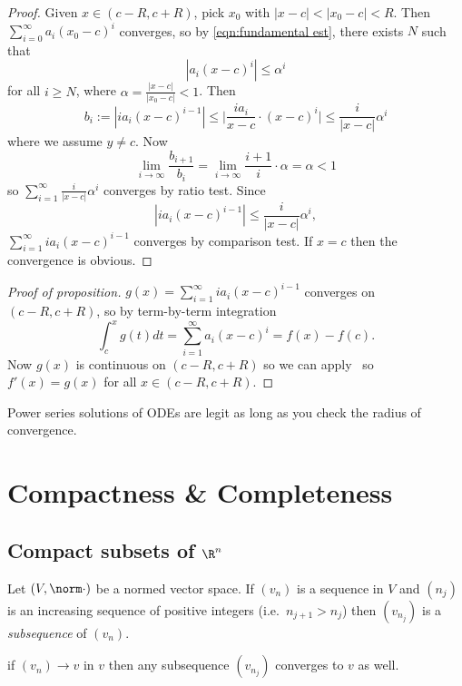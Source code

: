 \documentclass[a4paper]{article}
\theoremstyle{definition}
\begin{document}
\begin{proof}
  Given \(x\in(c-R,c+R)\), pick \(x_0\) with \(|x-c| < |x_0-c| < R\). Then \(\sum_{i=0}^{\infty}a_i(x_0-c)^i \) converges, so by \ref{eqn:fundamental est}, there exists \(N\) such that
  \[
    |a_i(x-c)^i| \leq \alpha^i
  \]
  for all \(i\geq N\), where \(\alpha = \frac{|x-c|}{|x_0-c|}<1\). Then
  \[
    b_i:= |i a_i (x-c)^{i-1}| \leq \Big| \frac{i a_i}{x-c}\cdot(x-c)^i \Big| \leq \frac{i}{|x-c|}\alpha^i
  \]
  where we assume \(y\neq c\). Now
  \[
    \lim_{i\to\infty} \frac{b_{i+1}}{b_i} = \lim_{i\to\infty} \frac{i+1}{i}\cdot\alpha = \alpha<1
  \]
  so \(\sum_{i=1}^{\infty}\frac{i}{|x-c|}\alpha^i \) converges by ratio test. Since
  \[
    |i a_i(x-c)^{i-1}| \leq \frac{i}{|x-c|}\alpha^i,
  \]
  \(\sum_{i=1}^{\infty}i a_i(x-c)^{i-1} \) converges by comparison test. If \(x=c\) then the convergence is obvious.
\end{proof}

\begin{proof}[Proof of proposition]
  \(g(x) = \sum_{i=1}^{\infty}i a_i (x-c)^{i-1} \) converges on \((c-R,c+R)\), so by term-by-term integration
  \[
    \int_{c}^{x} g(t) dt = \sum_{i=1}^{\infty}a_i(x-c)^i = f(x) - f(c).
  \]
  Now \(g(x)\) is continuous on \((c-R, c+R)\) so we can apply~ so \(f'(x) = g(x)\) for all \(x\in(c-R,c+R)\).
\end{proof}

\begin{application}
  Power series solutions of ODEs are legit as long as you check the radius of convergence.
\end{application}

\section{Compactness \& Completeness}

\subsection{Compact subsets of \texorpdfstring{\(\R^n\)}{ℝ\^{}n}}

Let \((V, \norm \cdot)\) be a normed vector space. If \((v_n)\) is a sequence in \(V\) and \((n_j)\) is an increasing sequence of positive integers (i.e.\ \(n_{j+1}>n_j\)) then \((v_{n_j})\) is a \emph{subsequence} of \((v_n)\).

\begin{ex}
  if \((v_n)\to v\) in \(v\) then any subsequence \((v_{n_j})\) converges to \(v\) as well.
\end{ex}
\end{document}
